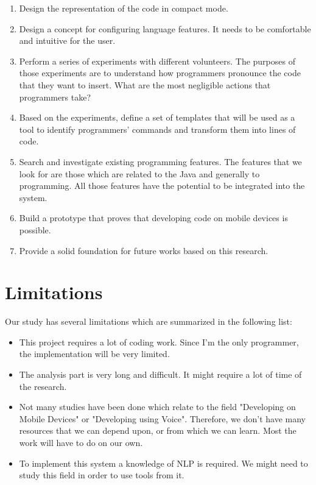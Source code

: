 \begin{enumerate}
	\item Design the representation of the code in compact mode.
	\item Design a concept for configuring language features. It needs to be comfortable and intuitive for the user.
	\item Perform a series of experiments with different volunteers. The purposes of those experiments are to understand how programmers pronounce the code that they want to insert. What are the most negligible actions that programmers take?
	\item Based on the experiments, define a set of templates that will be used as a tool to identify programmers’ commands and transform them into lines of code.
	\item Search and investigate existing programming features. The features that we look for are those which are related to the Java and generally to programming. All those features have the potential to be integrated into the system.
	\item Build a prototype that proves that developing code on mobile devices is possible.
	\item Provide a solid foundation for future works based on this research.
\end{enumerate}
\section{Limitations}
Our study has several limitations which are summarized in the following list: 
\begin{itemize}
	\item This project requires a lot of coding work. Since I'm the only programmer, the implementation will be very limited.
	\item The analysis part is very long and difficult. It might require a lot of time of the research.
	\item Not many studies have been done which relate to the field "Developing on Mobile Devices" or "Developing using Voice". Therefore, we don't have many resources that we can depend upon, or from which we can learn. Most the work will have to do on our own.
	\item To implement this system a knowledge of NLP is required. We might need to study this field in order to use tools from it.
\end{itemize}
